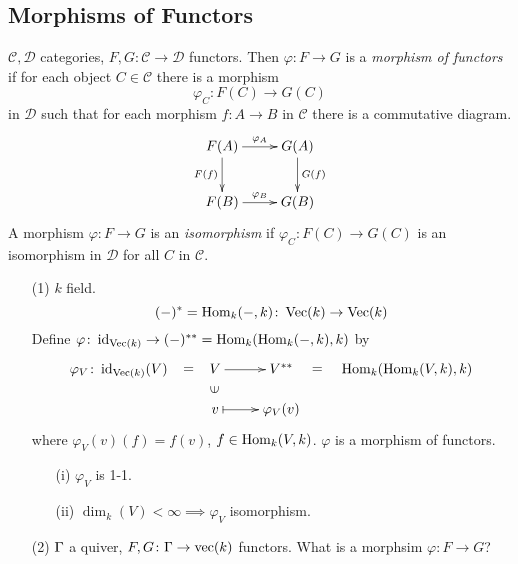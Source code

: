 \subsection{Morphisms of Functors}
\begin{defin}
$\mathcal{C}, \mathcal{D}$ categories, $F, G \colon  \mathcal{C} \to
\mathcal{D}$ functors. Then $\varphi \colon  F \to G$ is a
\emph{morphism of functors} if for each object $C \in \mathcal{C}$
there is a morphism 
\[\varphi_C \colon  F(C) \to G(C)\] 
in $\mathcal{D}$
such that for each morphism $f \colon  A \to B$ in $\mathcal{C}$ there
is a commutative diagram. 
\[\xymatrix{
F(A) \ar[r]^{\varphi_A} \ar[d]_{F(f)} & G(A) \ar[d]^{G(f)}\\
F(B) \ar[r]^{\varphi_B} & G(B)
}\]
A morphism $\varphi\colon F \to G$ is an \emph{isomorphism} if
$\varphi_C \colon F(C) \to G(C)$ is an isomorphism in $\mathcal{D}$
for all $C$ in $\mathcal{C}$.
\end{defin}

\begin{exam}
\begin{enumerate}
\item[]
\item[(1)] $k$ field.
\[(-)^* = \operatorname{Hom}_k(-, k) \colon  \operatorname{Vec}\nolimits(k) \to \operatorname{Vec}\nolimits(k)\]
Define $\varphi\colon  \operatorname{id}\nolimits_{\operatorname{Vec}\nolimits(k)} \to (-)^{**} = \operatorname{Hom}_k(\operatorname{Hom}_k(-,k), k)$ by
\[\xymatrix@R-1pc{
\varphi_V \colon  \id_{\Vec(k)}(V) \ar@{}[r]|-*[@]{=} & V \ar[r] & V^{**}\ar@{}[r]|-*[@]{=} & \Hom_k(\Hom_k(V,k), k)\\
                            & v \ar@{}[u]|-*[@]{\in} \ar@{|->}[r] & \varphi_V(v)
}\]
where $\varphi_V(v)(f) = f(v)$, $f \in \operatorname{Hom}_k(V,k)$. $\varphi$ is a morphism of functors.
\begin{exer}
\begin{enumerate}
\item[]
\item[(i)] $\varphi_V$ is 1-1.
\item[(ii)] $\dim_k(V) < \infty \implies \varphi_V$ isomorphism. 
\end{enumerate}
\end{exer}

\item[(2)] $\Gamma$ a quiver, $F, G\colon  \Gamma \to \operatorname{vec}\nolimits(k)$ functors. What
  is a morphsim $\varphi \colon  F \to G$? 
\end{enumerate}
\end{exam}


